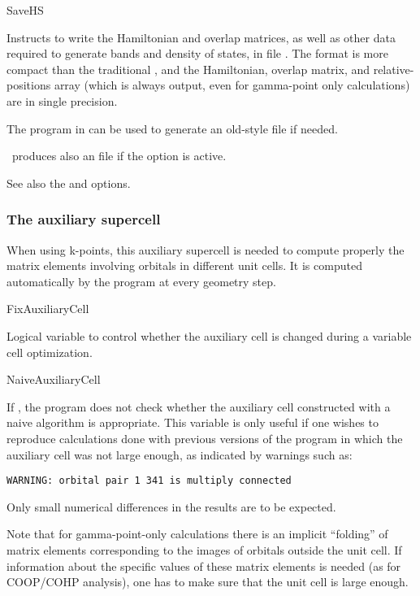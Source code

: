 \begin{fdflogicalF}{SaveHS}

  Instructs to write the Hamiltonian and overlap matrices, as well as
  other data required to generate bands and density of states, in file
  . The  format is more compact than the
  traditional , and the Hamiltonian, overlap matrix, and
  relative-positions array (which is always output, even for
  gamma-point only calculations) are in single precision.

  The program  in  can be used to
  generate an old-style  file if needed.

  \siesta\ produces also an  file if the  option
  is active.  


  See also the  and 
  options.

\end{fdflogicalF}



\subsubsection{The auxiliary supercell}

When using k-points, this auxiliary supercell is needed to compute properly
the matrix elements involving orbitals in different unit cells.
It is computed automatically by the program at every geometry step.

\begin{fdflogicalF}{FixAuxiliaryCell}
  
  Logical variable to control whether the auxiliary cell is changed
  during a variable cell optimization.

\end{fdflogicalF}

\begin{fdflogicalF}{NaiveAuxiliaryCell}
  
  If \fdftrue, the program does not check whether the auxiliary cell
  constructed with a naive algorithm is appropriate. This variable is
  only useful if one wishes to reproduce calculations done with
  previous versions of the program in which the auxiliary cell was not
  large enough, as indicated by warnings such as:

  \texttt{WARNING: orbital pair 1 341 is multiply connected}

  Only small numerical differences in the results are to be expected.
  
  Note that for gamma-point-only calculations there is an implicit
  ``folding'' of matrix elements corresponding to the images of orbitals
  outside the unit cell. If information about the specific values of
  these matrix elements is needed (as for COOP/COHP analysis), one has
  to make sure that the unit cell is large enough.  

\end{fdflogicalF}


